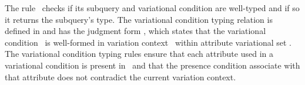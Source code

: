 %
The rule \selE\ checks if its subquery and variational condition are well-typed
and if so it returns the subquery's type. 
%
%
The variational condition typing relation is defined in  and has the 
judgment form \envCond \vCond, which states that the variational condition \vCond\
is well-formed in variation context \vctx\ within attribute variational set \vType.
The variational condition typing rules ensure that each attribute used in a
variational condition is present in \vType\ and that the presence condition associate with
that attribute does not contradict the current variation context.


